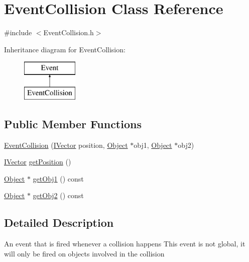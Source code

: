 \hypertarget{class_event_collision}{\section{Event\+Collision Class Reference}
\label{class_event_collision}
}


{\ttfamily \#include $<$Event\+Collision.\+h$>$}

Inheritance diagram for Event\+Collision\+:\begin{figure}[H]
\begin{center}
\leavevmode
\includegraphics[height=2.000000cm]{class_event_collision}
\end{center}
\end{figure}
\subsection*{Public Member Functions}
\begin{DoxyCompactItemize}
\item 
\hyperlink{class_event_collision_a7351501bd297d82811deed639c3c6d3d}{Event\+Collision} (\hyperlink{class_i_vector}{I\+Vector} position, \hyperlink{class_object}{Object} $\ast$obj1, \hyperlink{class_object}{Object} $\ast$obj2)
\item 
\hyperlink{class_i_vector}{I\+Vector} \hyperlink{class_event_collision_a9ed1a0fd9cc1006ef8a25574c5bb5a69}{get\+Position} ()
\item 
\hyperlink{class_object}{Object} $\ast$ \hyperlink{class_event_collision_a74ac21fbda77c2ffb080a0228178b5ae}{get\+Obj1} () const 
\item 
\hyperlink{class_object}{Object} $\ast$ \hyperlink{class_event_collision_a57b819fcb05e03b7b9ca41631881b909}{get\+Obj2} () const 
\end{DoxyCompactItemize}


\subsection{Detailed Description}
An event that is fired whenever a collision happens This event is not global, it will only be fired on objects involved in the collision 

